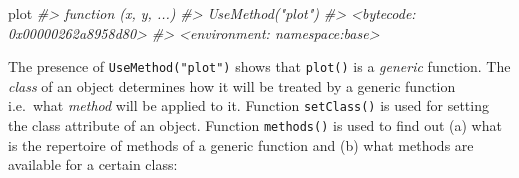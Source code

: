 \documentclass[
]{book}
\newenvironment{Shaded}{\begin{snugshade}}{\end{snugshade}}
\newcommand{\CommentTok}[1]{\textcolor[rgb]{0.56,0.35,0.01}{\textit{#1}}}
\newcommand{\NormalTok}[1]{#1}
\begin{document}
\begin{Shaded}
\begin{Highlighting}[]
\NormalTok{plot}
\CommentTok{\#\textgreater{} function (x, y, ...) }
\CommentTok{\#\textgreater{} UseMethod("plot")}
\CommentTok{\#\textgreater{} \textless{}bytecode: 0x00000262a8958d80\textgreater{}}
\CommentTok{\#\textgreater{} \textless{}environment: namespace:base\textgreater{}}
\end{Highlighting}
\end{Shaded}

The presence of \texttt{UseMethod("plot")} shows that \texttt{plot()} is a \emph{{generic}} function. The \emph{{class}} of an object determines how it will be treated by a generic function i.e.~what \emph{{method}} will be applied to it. Function \texttt{setClass()} is used for setting the class attribute of an object. Function \texttt{methods()} is used to find out (a) what is the repertoire of methods of a generic function and (b) what methods are available for a certain class:
\end{document}
